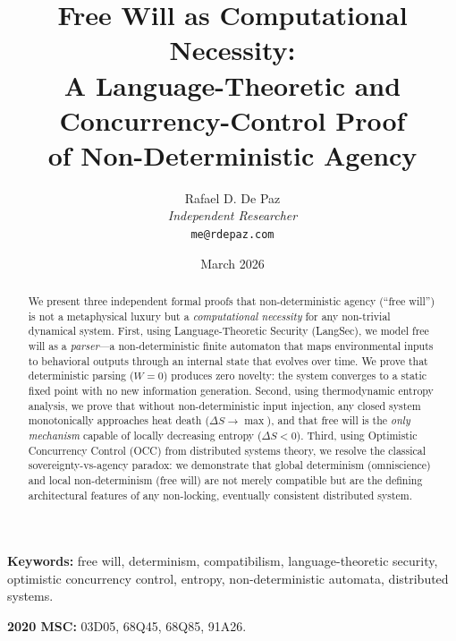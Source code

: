 \documentclass[12pt, a4paper]{article}
\theoremstyle{plain}
\theoremstyle{definition}
\theoremstyle{remark}
\begin{document}
\title{
  \textbf{Free Will as Computational Necessity: \\
  A Language-Theoretic and Concurrency-Control Proof \\
  of Non-Deterministic Agency}
}
\author{
  Rafael D. De Paz \\
  \textit{Independent Researcher} \\
  \texttt{me@rdepaz.com}
}
\date{March 2026}
\maketitle

\begin{abstract}
We present three independent formal proofs that non-deterministic agency
(``free will'') is not a metaphysical luxury but a \emph{computational
necessity} for any non-trivial dynamical system. First, using
Language-Theoretic Security (LangSec), we model free will as a
\emph{parser}---a non-deterministic finite automaton that maps environmental
inputs to behavioral outputs through an internal state that evolves over time.
We prove that deterministic parsing ($W = 0$) produces zero novelty: the system
converges to a static fixed point with no new information generation. Second,
using thermodynamic entropy analysis, we prove that without non-deterministic
input injection, any closed system monotonically approaches heat death
($\Delta S \to \max$), and that free will is the \emph{only mechanism} capable
of locally decreasing entropy ($\Delta S < 0$). Third, using Optimistic
Concurrency Control (OCC) from distributed systems theory, we resolve the
classical sovereignty-vs-agency paradox: we demonstrate that global
determinism (omniscience) and local non-determinism (free will) are not merely
compatible but are the defining architectural features of any non-locking,
eventually consistent distributed system.
\end{abstract}

\vspace{1em}
\noindent\textbf{Keywords:} free will, determinism, compatibilism,
language-theoretic security, optimistic concurrency control, entropy,
non-deterministic automata, distributed systems.

\vspace{0.5em}
\noindent\textbf{2020 MSC:} 03D05, 68Q45, 68Q85, 91A26.
\end{document}
